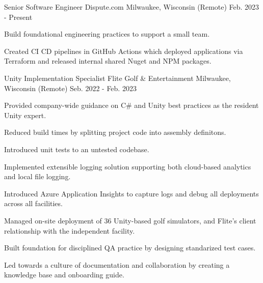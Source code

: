 

\begin{cventries}

  \cventry
    {Senior Software Engineer} %
    {Dispute.com} %
    {Milwaukee, Wisconsin (Remote)} %
    {Feb. 2023 - Present} %
    {
      \begin{cvitems} %
        \item {Build foundational engineering practices to support a small team.}
        \item {Created CI CD pipelines in GitHub Actions which deployed applications via Terraform and released internal shared Nuget and NPM packages.}
      \end{cvitems}
    }

  \cventry
    {Unity Implementation Specialist} %
    {Flite Golf \& Entertainment} %
    {Milwaukee, Wisconsin (Remote)} %
    {Seb. 2022 - Feb. 2023} %
    {
      \begin{cvitems} %
        \item {Provided company-wide guidance on C\# and Unity best practices as the resident Unity expert.}
        \item {Reduced build times by splitting project code into assembly definitons.}
        \item {Introduced unit tests to an untested codebase.}
        \item {Implemented extensible logging solution supporting both cloud-based analytics and local file logging.}
        \item {Introduced Azure Application Insights to capture logs and debug all deployments across all facilities.}
        \item {Managed on-site deployment of 36 Unity-based golf simulators, and Flite's client relationship with the independent facility.}
        \item {Built foundation for disciplined QA practice by designing standarized test cases.}
        \item {Led towards a culture of documentation and collaboration by creating a knowledge base and onboarding guide.}
      \end{cvitems}
    }


\end{cventries}
